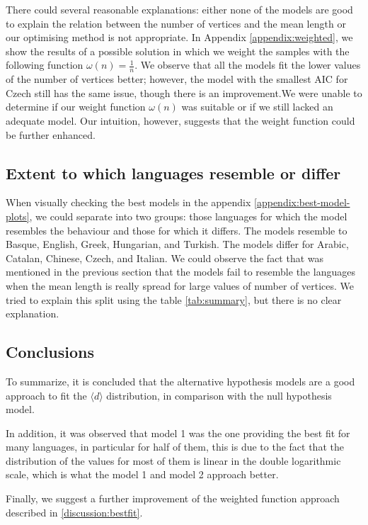 There could several reasonable explanations: either none of the models are good to explain the relation between the number of vertices and the mean length or our optimising method is not appropriate. In Appendix \ref{appendix:weighted}, we show the results of a possible solution in which we weight the samples with the following function $\omega(n) = \frac{1}{n}$. We observe that all the models fit the lower values of the number of vertices better; however, the model with the smallest AIC for Czech still has the same issue, though there is an improvement.We were unable to determine if our weight function $\omega(n)$ was suitable or if we still lacked an adequate model. Our intuition, however, suggests that the weight function could be further enhanced.

\subsection{Extent to which languages resemble or differ}

When visually checking the best models in the appendix \ref{appendix:best-model-plots}, we could separate into two groups: those languages for which the model resembles the behaviour and those for which it differs. The models resemble to Basque, English, Greek, Hungarian, and Turkish. The models differ for Arabic, Catalan, Chinese, Czech, and Italian. We could observe the fact that was mentioned in the previous section that the models fail to resemble the languages when the mean length is really spread for large values of number of vertices. We tried to explain this split using the table \ref{tab:summary}, but there is no clear explanation.



\subsection{Conclusions}

To summarize, it is concluded that the alternative hypothesis models are a good approach to fit the $\langle  d \rangle$ distribution, in comparison with the null hypothesis model.

In addition, it was observed that model 1 was the one providing the best fit for many languages, in particular for half of them, this is due to the fact that the distribution of the values for most of them is linear in the double logarithmic scale, which is what the model 1 and model 2 approach better.

Finally, we suggest a further improvement of the weighted function approach described in \ref{discussion:bestfit}.